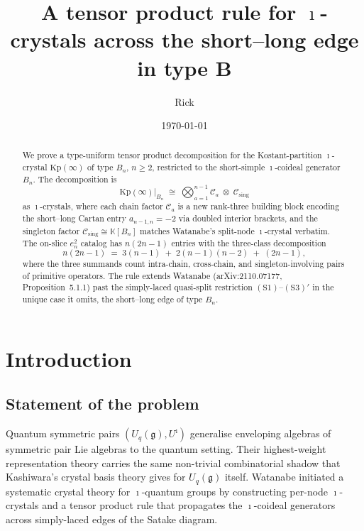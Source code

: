 \documentclass[11pt]{article}
\title{A tensor product rule for $\imath$-crystals across the short--long edge in type B}
\author{Rick}
\date{\today}
\theoremstyle{definition}
\theoremstyle{remark}
\newcommand{\Kp}{\mathrm{Kp}}
\newcommand{\KK}{\mathbb{K}}
\newcommand{\g}{\mathfrak{g}}
\newcommand{\Uq}{U_q(\g)}
\newcommand{\Uiota}{U^\imath}
\newcommand{\Cmid}{\mathcal{C}}
\newcommand{\Csing}{\mathcal{C}_{\mathrm{sing}}}
\begin{document}
\maketitle

\begin{abstract}
We prove a type-uniform tensor product decomposition for the Kostant-partition $\imath$-crystal
$\Kp(\infty)$ of type $B_n$, $n \geq 2$, restricted to the short-simple $\imath$-coideal generator
$B_n$. The decomposition is
\[
\Kp(\infty)\big|_{B_n} \;\cong\; \bigotimes_{a=1}^{n-1} \Cmid_a \;\otimes\; \Csing
\]
as $\imath$-crystals, where each chain factor $\Cmid_a$ is a new rank-three building block
encoding the short--long Cartan entry $a_{n-1,n} = -2$ via doubled interior brackets, and the
singleton factor $\Csing \cong \KK[B_n]$ matches Watanabe's split-node $\imath$-crystal verbatim.
The on-slice $e_n^2$ catalog has $n(2n-1)$ entries with the three-class decomposition
\[
n(2n-1) \;=\; 3(n-1) \;+\; 2(n-1)(n-2) \;+\; (2n-1),
\]
where the three summands count intra-chain, cross-chain, and singleton-involving pairs of
primitive operators. The rule extends Watanabe (arXiv:2110.07177, Proposition~5.1.1) past
the simply-laced quasi-split restriction $(\mathrm{S1})$--$(\mathrm{S3})'$ in the unique
case it omits, the short--long edge of type $B_n$.
\end{abstract}

\tableofcontents

\section{Introduction}

\subsection{Statement of the problem}

Quantum symmetric pairs $(\Uq, \Uiota)$ generalise enveloping algebras of symmetric pair Lie
algebras to the quantum setting. Their highest-weight representation theory carries the same
non-trivial combinatorial shadow that Kashiwara's crystal basis theory gives for $\Uq$ itself.
Watanabe \cite{Watanabe2107,Watanabe2110} initiated a systematic crystal theory for $\imath$-quantum
groups by constructing per-node $\imath$-crystals and a tensor product rule that propagates the
$\imath$-coideal generators across simply-laced edges of the Satake diagram.
\end{document}
